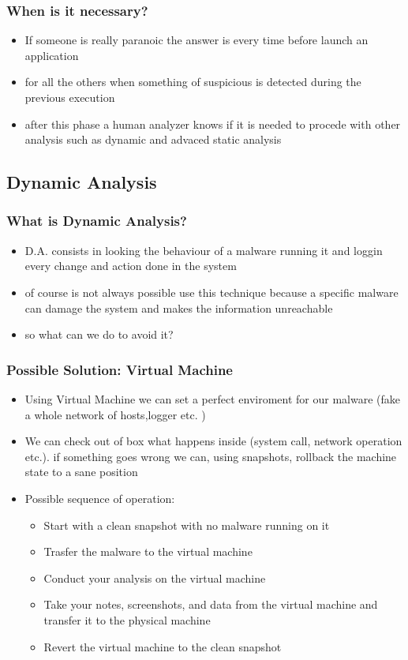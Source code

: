 \documentclass[]{beamer}
\begin{document}
		\begin{frame}
			\frametitle{When is it necessary?}
			\begin{itemize}
				\item {If someone is really paranoic the answer is every time before launch  an application }
				\item {for all the others when something of suspicious is detected during the previous execution}
				\item {after this phase a human analyzer knows if it is needed to procede with other analysis such as dynamic and advaced static analysis}
			\end{itemize}	
		\end{frame}

	\subsection{Dynamic Analysis}
		\begin{frame}
			\frametitle{What is Dynamic Analysis?}
			\begin{itemize}
				\item {D.A. consists in  looking the behaviour of a malware running it and loggin every change and action done in the system}
				\item {of course is not always possible use this technique because a specific malware can damage the system and makes the information unreachable}
				\item {so what can we do to avoid it?}
			\end{itemize}
		\end{frame}
		\begin{frame}
			\frametitle{Possible Solution: Virtual Machine}
			\begin{itemize}
				\item {Using Virtual Machine we can set a perfect enviroment for our malware (fake a whole network of hosts,logger etc. )}
				\item {We can check out of box what happens inside (system call, network operation etc.).\newline
					if something goes wrong we can, using snapshots, rollback the machine state to a sane position					    }
				\item {Possible sequence of operation:}
					\begin{itemize}
						\item{Start with a clean snapshot with no malware running on it}
						\item{Trasfer the malware to the virtual machine}
						\item{Conduct your analysis on the virtual machine}
						\item{Take your notes, screenshots, and data from the virtual machine and transfer it to the physical machine}
						\item{Revert the virtual machine to the clean snapshot}			
					\end{itemize}	
			\end{itemize}
		\end{frame}
\end{document}
